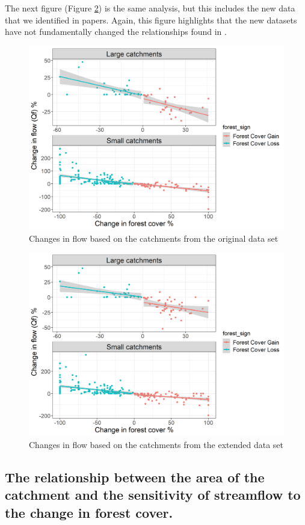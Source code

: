 \documentclass[]{elsarticle} %
\begin{document}
The next figure (Figure \ref{fig:Fig2Zhangnew}) is the same analysis, but this includes the new data that we identified in papers. Again, this figure highlights that the new datasets have not fundamentally changed the relationships found in \citet{zhang2017}.

\begin{figure}
\includegraphics[width=0.9\linewidth]{Fig2Zhang} \caption{Changes in flow based on the catchments from the original data set}\label{fig:Fig2Zhang}
\end{figure}

\begin{figure}
\includegraphics[width=0.9\linewidth]{Fig2Zhang_all} \caption{Changes in flow based on the catchments from the extended data set}\label{fig:Fig2Zhangnew}
\end{figure}

\hypertarget{the-relationship-between-the-area-of-the-catchment-and-the-sensitivity-of-streamflow-to-the-change-in-forest-cover.}{%
\subsection{The relationship between the area of the catchment and the sensitivity of streamflow to the change in forest cover.}\label{the-relationship-between-the-area-of-the-catchment-and-the-sensitivity-of-streamflow-to-the-change-in-forest-cover.}}
\end{document}
